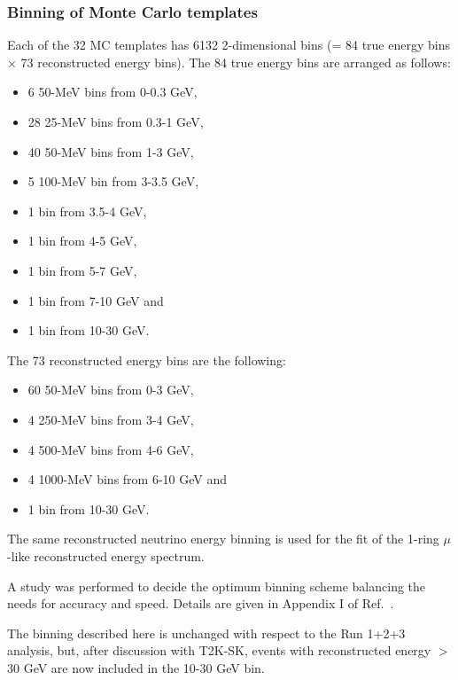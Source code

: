 \subsubsection {Binning of Monte Carlo templates}
\label{sec:mc_templates:template_binning}

Each of the 32 MC templates has 6132 2-dimensional bins (= 84 true energy bins $\times$ 73 reconstructed energy bins).
The 84 true energy bins are arranged as follows:
\begin{itemize}
 \item   6 50-MeV bins from 0-0.3 GeV, 
 \item   28 25-MeV bins from 0.3-1 GeV, 
 \item   40 50-MeV bins from 1-3 GeV, 
 \item   5 100-MeV bin from 3-3.5 GeV, 
 \item   1 bin from 3.5-4 GeV, 
 \item   1 bin from 4-5 GeV, 
 \item   1 bin from 5-7 GeV, 
 \item   1 bin from 7-10 GeV and
 \item   1 bin from 10-30 GeV.
\end{itemize}

The 73 reconstructed energy bins are the following:
\begin{itemize}
 \item   60 50-MeV bins from 0-3 GeV, 
 \item   4 250-MeV bins from 3-4 GeV, 
 \item   4 500-MeV bins from 4-6 GeV, 
 \item   4 1000-MeV bins from 6-10 GeV and
 \item   1 bin from 10-30 GeV.
\end{itemize}
The same reconstructed neutrino energy binning is used for the fit of the 1-ring $\mu$-like reconstructed energy spectrum.

A study was performed to decide the optimum binning scheme balancing the needs for accuracy and speed.
Details are given in Appendix I of Ref.\ \cite{OurRun123DisappAnalysis3Flavour}.

The binning described here is unchanged with respect to the Run 1+2+3 analysis,
but, after discussion with T2K-SK, events with reconstructed energy $>$30 GeV are now included in
the 10-30 GeV bin.

